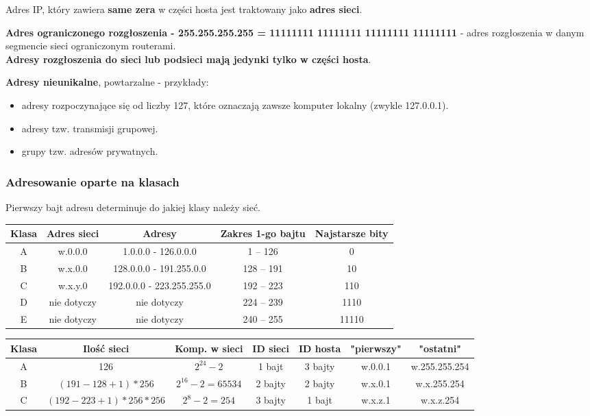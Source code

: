 \documentclass[a4paper]{article}
\begin{document}
Adres IP, który zawiera \textbf{same zera} w części hosta jest traktowany jako \textbf{adres sieci}.

\textbf{Adres ograniczonego rozgłoszenia - 255.255.255.255 = 11111111 11111111 11111111 11111111} -  adres rozgłoszenia
w danym segmencie sieci ograniczonym routerami.\\
\textbf{Adresy rozgłoszenia do sieci lub podsieci mają jedynki tylko w części hosta}.

\textbf{Adresy nieunikalne}, powtarzalne - przykłady:
\begin{itemize}
    \item adresy rozpoczynające się od liczby 127, które oznaczają zawsze komputer lokalny (zwykle 127.0.0.1).
    \item adresy tzw. transmisji grupowej.
    \item grupy tzw. adresów prywatnych.
\end{itemize}

\subsubsection{Adresowanie oparte na klasach}

Pierwszy bajt adresu determinuje do jakiej klasy należy sieć.

\begin{tabular}{|c|c|c|c|c|}
\hline
Klasa & Adres sieci & Adresy & Zakres 1-go bajtu & Najstarsze bity\\
\hline
A & w.0.0.0 & 1.0.0.0 - 126.0.0.0 & 1 – 126 & 0\\
\hline
B & w.x.0.0 & 128.0.0.0 - 191.255.0.0 & 128 – 191 & 10\\
\hline
C & w.x.y.0 & 192.0.0.0 - 223.255.255.0 & 192 – 223 & 110\\
\hline
D & nie dotyczy & nie dotyczy & 224 – 239 & 1110\\
\hline
E & nie dotyczy & nie dotyczy & 240 – 255 & 11110\\
\hline
\end{tabular}


\begin{tabular}{|c|c|c|c|c|c|c|}
\hline
Klasa & Ilość sieci & Komp. w sieci & ID sieci & ID hosta & "pierwszy" & "ostatni"\\
\hline
A & 126 & $2^{24}-2$ & 1 bajt & 3 bajty & w.0.0.1 & w.255.255.254\\
\hline
B & $(191-128+1)*256$ & $2^{16}-2 = 65 534$ & 2 bajty & 2 bajty & w.x.0.1 & w.x.255.254\\
\hline
C & $(192-223+1)*256*256$ & $2^8 -2 = 254$ & 3 bajty & 1 bajt & w.x.z.1 & w.x.z.254\\
\hline
\end{tabular}
\end{document}
